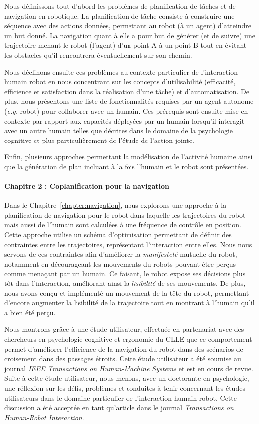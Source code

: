 Nous définissons tout d'abord les problèmes de planification de tâches et de navigation en robotique. La planification de tâche consiste à construire une séquence avec des actions données, permettant au robot (à un agent) d'atteindre un but donné. La navigation quant à elle a pour but de générer (et de suivre) une trajectoire menant le robot (l'agent) d'un point A à un point B tout en évitant les obstacles qu'il rencontrera éventuellement sur son chemin.

Nous déclinons ensuite ces problèmes au contexte particulier de l'interaction humain robot en nous concentrant sur les concepts d'utilisabilité (efficacité, efficience et satisfaction dans la réalisation d'une tâche) et d'automatisation. De plus, nous présentons une liste de fonctionnalités requises par un agent autonome (\textit{e.g.} robot) pour collaborer avec un humain. Ces prérequis sont ensuite mise en contexte par rapport aux capacités déployées par un humain lorsqu'il interagit avec un autre humain telles que décrites dans le domaine de la psychologie cognitive et plus particulièrement de l'étude de l'action jointe.

Enfin, plusieurs approches permettant la modélisation de l'activité humaine ainsi que la génération de plan incluant à la fois l'humain et le robot sont présentées.

\paragraph{Chapitre 2 : Coplanification pour la navigation}
Dans le Chapitre~\ref{chapter:navigation}, nous explorons une approche à la planification de navigation pour le robot dans laquelle les trajectoires du robot mais aussi de l'humain sont calculées à une fréquence de contrôle en position. Cette approche utilise un schéma d'optimisation permettant de définir des contraintes entre les trajectoires, représentant l'interaction entre elles. Nous nous servons de ces contraintes afin d'améliorer la \textit{manifesteté} mutuelle du robot, notamment en décourageant les mouvements du robots pouvant être perçus comme menaçant par un humain. Ce faisant, le robot expose ses décisions plus tôt dans l'interaction, améliorant ainsi la \textit{lisibilité} de ses mouvements. De plus, nous avons conçu et implémenté un mouvement de la tête du robot, permettant d'encore augmenter la lisibilité de la trajectoire tout en montrant à l'humain qu'il a bien été perçu.

Nous montrons grâce à une étude utilisateur, effectuée en partenariat avec des chercheurs en psychologie cognitive et ergonomie du CLLE que ce comportement permet d'améliorer l’efficience de la navigation du robot dans des scénarios de croisement dans des passages étroits. Cette étude utilisateur a été soumise au journal \textit{IEEE Transactions on Human-Machine Systems} et est en cours de revue. Suite à cette étude utilisateur, nous menons, avec un doctorante en psychologie, une réflexion sur les défis, problèmes et conduites à tenir concernant les études utilisateurs dans le domaine particulier de l'interaction humain robot. Cette discussion a été acceptée en tant qu'article dans le journal \textit{Transactions on Human-Robot Interaction}.


